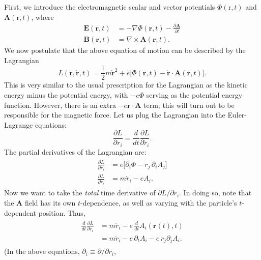 \documentclass[pra,12pt]{revtex4}
\begin{document}
First, we introduce the electromagnetic scalar and vector potentials
$\Phi(\mathrm{r},t)$ and $\mathbf{A}(\mathrm{r},t)$, where
\begin{align}
  \mathbf{E}(\mathbf{r},t) &= - \nabla \Phi(\mathbf{r},t) - \frac{\partial\mathbf{A}}{\partial t} \\
  \mathbf{B}(\mathbf{r},t) &= \nabla \times \mathbf{A}(\mathbf{r},t).
  \label{Bfield}
\end{align}
We now postulate that the above equation of motion can be described by
the Lagrangian
\begin{equation}
  L(\mathbf{r},\dot{\mathbf{r}},t) = \frac{1}{2}m\dot{\mathbf{r}}^2
  + e \Big[\Phi(\mathbf{r},t) - \dot{\mathbf{r}} \cdot \mathbf{A}(\mathbf{r},t)
    \Big].
\end{equation}
This is very similar to the usual prescription for the Lagrangian as
the kinetic energy minus the potential energy, with $-e\Phi$ serving
as the potential energy function.  However, there is an extra
$-e\dot{\mathbf{r}} \cdot \mathbf{A}$ term; this will turn out to be
responsible for the magnetic force.  Let us plug the Lagrangian into
the Euler-Lagrange equations:
\begin{equation}
  \frac{\partial L}{\partial r_i} = \frac{d}{dt}
  \frac{\partial L}{\partial \dot{r}_i}.
\end{equation}
The partial derivatives of the Lagrangian are:
\begin{align}
  \begin{aligned}
    \frac{\partial L}{\partial r_i} &=
    e\Big[\partial_i \Phi - \dot{r}_j \,\partial_i A_j \Big]\\
    \frac{\partial L}{\partial \dot{r}_i} &= m\dot{r}_i - e A_i.
  \end{aligned}
\end{align}
Now we want to take the \textit{total} time derivative of $\partial L
/\partial \dot{r}_i$.  In doing so, note that the $\mathbf{A}$ field
has its own $t$-dependence, as well as varying with the particle's
$t$-dependent position.  Thus,
\begin{align}
  \begin{aligned}
    \frac{d}{dt} \frac{\partial L}{\partial \dot{r}_i}
    &= m\ddot{r}_i - e\, \frac{d}{dt} A_i(\mathbf{r}(t),t) \\
    &= m\ddot{r}_i - e\, \partial_t A_i
    - e\, \dot{r}_j \partial_j A_i.
  \end{aligned}
\end{align}
(In the above equations, $\partial_i \equiv \partial/\partial r_i$,
\end{document}
